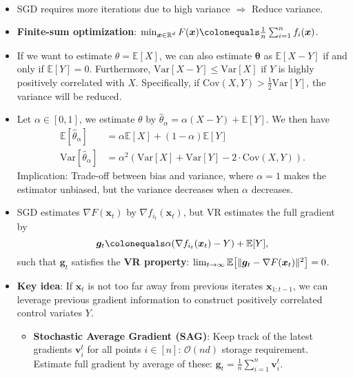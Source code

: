 \documentclass[8pt,a4paper]{extarticle}
\newcommand{\lft}{\mathopen{}\mathclose\bgroup\left}
\newcommand{\rgt}{\aftergroup\egroup\right}
\newcommand{\E}{\mathbb{E}}
\newcommand{\R}{\mathbb{R}}
\newcommand{\Var}{\mathrm{Var}}
\renewcommand{\vec}[1]{\bm{#1}}
\newenvironment{topic}[1]
{\textbf{\sffamily \colorbox{black}{\rlap{\textbf{\textcolor{white}{#1}}}\hspace{\linewidth}\hspace{-2\fboxsep}}} \\ \vspace{0.2cm}}
{}
\begin{document}
\begin{multicols*}{2}
    \begin{topic}{Variance reduction}
        \begin{itemize}
            \item SGD requires more iterations due to high variance $\Rightarrow$ Reduce variance.
            \item \textbf{Finite-sum optimization}: $\min_{\vec{x} \in \R^d} F(\vec{x}) \colonequals \frac{1}{n} \sum_{i=1}^{n} f_i(\vec{x})$.
            \item If we want to estimate $\theta = \E[X]$, we can also estimate $\vec{\theta}$ as $\E[X-Y]$ if and
                  only if $\E[Y] = 0$. Furthermore, $\Var[X-Y] \leq \Var[X]$ if $Y$ is highly positively correlated
                  with $X$. Specifically, if $\mathrm{Cov}(X, Y) > \frac{1}{2} \Var[Y]$, the variance will be
                  reduced.
            \item Let $\alpha \in [0,1]$, we estimate $\theta$ by $\hat{\theta}_{\alpha} = \alpha(X-Y) + \E[Y]$. We
                  then have
                  \begin{align*}
                      \E[\hat{\theta}_{\alpha}]   & = \alpha\E[X] + (1-\alpha)\E[Y]                             \\
                      \Var[\hat{\theta}_{\alpha}] & = \alpha^2 (\Var[X] + \Var[Y] - 2 \cdot \mathrm{Cov}(X,Y)).
                  \end{align*}
                  Implication: Trade-off between bias and variance, where $\alpha=1$ makes the estimator unbiased, but the variance decreases when $\alpha$ decreases.
            \item SGD estimates $\nabla F(\vec{x}_t)$ by $\nabla f_{i_t}(\vec{x}_t)$, but VR estimates the full
                  gradient by \[
                      \vec{g}_t \colonequals \alpha(\nabla f_{i_t}(\vec{x}_t) - Y) + \E[Y],
                  \]
                  such that $\vec{g}_t$ satisfies the \textbf{VR property}: $\lim_{t \to \infty} \E \lft[ \|
                          \vec{g}_t - \nabla F(\vec{x}_t) \|^2 \rgt] = 0$.
            \item \textbf{Key idea}: If $\vec{x}_t$ is not too far away from previous iterates
                  $\vec{x}_{1:t-1}$, we can leverage previous gradient information to construct
                  positively correlated control variates $Y$.
                  \begin{itemize}
                      \item \textbf{Stochastic Average Gradient (SAG)}: Keep track of the latest gradients $\vec{v}_i^t$ for all points $i \in [n]$: $\mathcal{O}(nd)$ storage requirement. Estimate full gradient by average of these: $\vec{g}_t = \frac{1}{n} \sum_{i=1}^{n} \vec{v}_i^t$.

\end{itemize}
\end{itemize}
\end{topic}
\end{multicols*}
\end{document}
